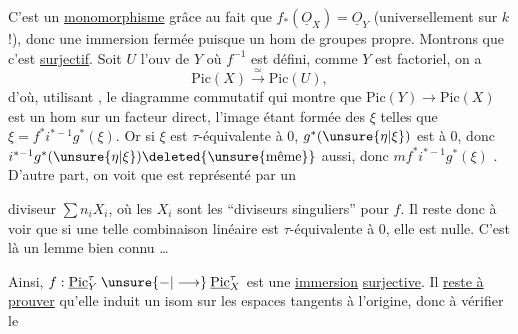C'est un \uline{monomorphisme} grâce au fait que
$f_*(\underline O_X)=\underline O_Y$ (universellement sur $k$ !),
donc une immersion fermée puisque un hom de groupes
 propre.
Montrons que c'est \uline{surjectif}.
Soit $U$ l'ouv de $Y$ où $f^{-1}$ est défini,
comme $Y$ est factoriel, on a
\[
\mathrm{Pic}(X)\xrightarrow{\simeq}\mathrm{Pic}(U),
\]
d'où, utilisant
,
le diagramme commutatif
qui montre que $\mathrm{Pic}(Y)\to\mathrm{Pic}(X)$ est un hom
sur un facteur direct, l'image étant formée des $\xi$ telles que
$\xi=f^*i^{*-1}g^*(\xi)$.
Or si $\xi$ est  $\tau$-équivalente à $0$,
$g^*(\unsure{\eta|\xi})$ est
 à $0$,
donc $i^{*-1}g^*(\unsure{\eta|\xi})\deleted{\text{\unsure{même}}}$ aussi,
donc $mf^*i^{*-1}g^*(\xi)$
.
D'autre part, on voit que
est représenté par un


diviseur $\sum n_iX_i$, où les $X_i$ sont les ``diviseurs singuliers''
pour $f$. Il reste donc à voir que si une telle combinaison linéaire est
$\tau$-équivalente à $0$, elle est nulle.
C'est là un lemme bien connu \ldots


Ainsi, $f:\underline{\mathrm{Pic}}_Y^\tau\mathbin{\unsure{-|\longrightarrow}}
\underline{\mathrm{Pic}}_X^\tau$ est une \uline{immersion}
\uline{surjective}.
Il \uline{reste à prouver} qu'elle induit un isom sur les espaces tangents
à l'origine, donc à vérifier le

